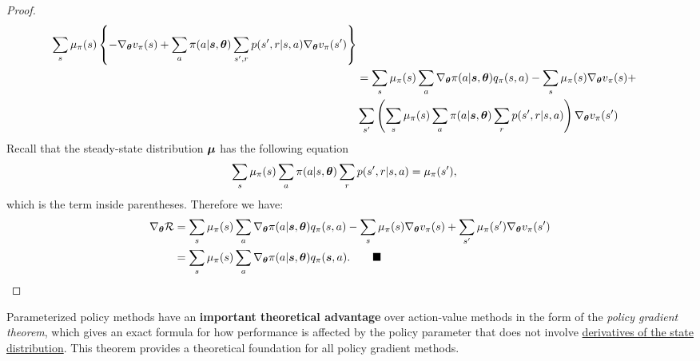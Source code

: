 \documentclass[11pt]{article}
\begin{document}
\begin{proof}
\begin{align*}
\sum_{s}\mu_{\pi}(s)\left\{ -\nabla_{\boldsymbol{\theta}}{v_{\pi}(s)} +\sum_{a}\pi(a|\boldsymbol{s}, \boldsymbol{\theta})\sum_{s', r}p(s', r| s, a) \nabla_{\boldsymbol{\theta}}{v_{\pi}(s')}\right\}\\
&=  \sum_{s}\mu_{\pi}(s)\sum_{a}\nabla_{\boldsymbol{\theta}}{\pi(a|\boldsymbol{s}, \boldsymbol{\theta})}q_{\pi}(s, a) - \sum_{s}\mu_{\pi}(s) \nabla_{\boldsymbol{\theta}}{v_{\pi}(s)}  + \\
& \sum_{s'}\left(\sum_{s}\mu_{\pi}(s)\sum_{a}\pi(a|\boldsymbol{s}, \boldsymbol{\theta})\sum_{r}p(s', r| s, a)\right) \nabla_{\boldsymbol{\theta}}{v_{\pi}(s')}
\end{align*}
Recall  that the steady-state distribution $\boldsymbol{\mu}$ has the following equation
\begin{align*}
\sum_{s}\mu_{\pi}(s)\sum_{a}\pi(a |s, \boldsymbol{\theta}) \sum_{r}p(s', r| s, a) &= \mu_{\pi}(s'),
\end{align*} which is the term inside parentheses. Therefore we have:
\begin{align*}
\grad{\mb{\theta}}{\cR} &=\sum_{s}\mu_{\pi}(s)\sum_{a}\grad{\mb{\theta}}{\pi(a|\mb{s}, \mb{\theta})}q_{\pi}(s, a) - \sum_{s}\mu_{\pi}(s) \grad{\mb{\theta}}{v_{\pi}(s)}  +\sum_{s'}\mu_{\pi}(s')\grad{\mb{\theta}}{v_{\pi}(s')} \\
&= \sum_{s}\mu_{\pi}(s)\sum_{a}\grad{\mb{\theta}}{\pi(a|\mb{s}, \mb{\theta})}q_{\pi}(\mb{s}, a). \qquad \QEDA
\end{align*} 
\end{proof}

Parameterized policy methods have an \textbf{important theoretical advantage} over action-value methods in the form of the \emph{policy gradient theorem}, which gives an exact formula for how performance is affected by the policy parameter that does not involve \underline{derivatives of the state distribution}. This theorem provides a theoretical foundation for all policy gradient methods.
\end{document}
